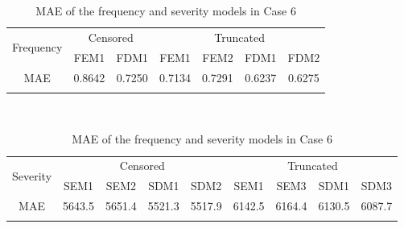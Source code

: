 \begin{table}[!h]
\renewcommand{\tabcolsep}{0.8mm}
\renewcommand{\arraystretch}{1}
\footnotesize
\centering
{\color{blue}
\begin{tabular}[h]{ccccccc}
\toprule
\multirow{2}{*}{Frequency} & \multicolumn{2}{c}{Censored} & \multicolumn{4}{c}{Truncated}\\
\cmidrule(l{3pt}r{3pt}){2-3} \cmidrule(l{3pt}r{3pt}){4-7}
 & FEM1 & FDM1 & FEM1 & FEM2 & FDM1 & FDM2\\
\midrule
MAE & 0.8642 & 0.7250 & 0.7134 & 0.7291 & 0.6237 & 0.6275 \\
\hhline{=======}
\end{tabular}
\\
\vspace{0.3cm}
\begin{tabular}[h]{ccccccccc}
\toprule
\multirow{2}{*}{Severity} & \multicolumn{4}{c}{Censored} & \multicolumn{4}{c}{Truncated}\\
\cmidrule(l{3pt}r{3pt}){2-5} \cmidrule(l{3pt}r{3pt}){6-9}
 & SEM1 & SEM2 & SDM1 & SDM2 & SEM1 & SEM3 & SDM1 & SDM3\\
\midrule
MAE & 5643.5 & 5651.4 & 5521.3 & 5517.9 & 6142.5 & 6164.4 & 6130.5 & 6087.7 \\
\hhline{=========}
\end{tabular}
}
\caption{MAE of the frequency and severity models in Case 6}\label{tab:maecase6}
\end{table}
